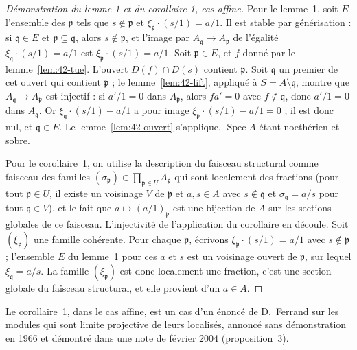 \begin{proof}[Démonstration du lemme 1 et du corollaire 1, cas affine]
Pour le lemme~1, soit $E$ l'ensemble des $\mathfrak p$ tels que $s \notin \mathfrak p$ et $\xi_{\mathfrak p} \cdot (s/1) = a/1$. Il est stable par générisation : si $\mathfrak q \in E$ et $\mathfrak p \subseteq \mathfrak q$, alors $s \notin \mathfrak p$, et l'image par $A_{\mathfrak q} \to A_{\mathfrak p}$ de l'égalité $\xi_{\mathfrak q} \cdot (s/1) = a/1$ est $\xi_{\mathfrak p} \cdot (s/1) = a/1$. Soit $\mathfrak p \in E$, et $f$ donné par le lemme~\ref{lem:42-tue}. L'ouvert $D(f) \cap D(s)$ contient $\mathfrak p$. Soit $\mathfrak q$ un premier de cet ouvert qui contient $\mathfrak p$ ; le lemme~\ref{lem:42-lift}, appliqué à $S = A \setminus \mathfrak q$, montre que $A_{\mathfrak q} \to A_{\mathfrak p}$ est injectif : si $a'/1 = 0$ dans $A_{\mathfrak p}$, alors $fa' = 0$ avec $f \notin \mathfrak q$, donc $a'/1 = 0$ dans $A_{\mathfrak q}$. Or $\xi_{\mathfrak q} \cdot (s/1) - a/1$ a pour image $\xi_{\mathfrak p} \cdot (s/1) - a/1 = 0$ ; il est donc nul, et $\mathfrak q \in E$. Le lemme~\ref{lem:42-ouvert} s'applique, $\operatorname{Spec} A$ étant noethérien et sobre.

Pour le corollaire~1, on utilise la description du faisceau structural comme faisceau des familles $(\sigma_{\mathfrak p}) \in \prod_{\mathfrak p \in U} A_{\mathfrak p}$ qui sont localement des fractions (pour tout $\mathfrak p \in U$, il existe un voisinage $V$ de $\mathfrak p$ et $a, s \in A$ avec $s \notin \mathfrak q$ et $\sigma_{\mathfrak q} = a/s$ pour tout $\mathfrak q \in V$), et le fait que $a \mapsto (a/1)_{\mathfrak p}$ est une bijection de $A$ sur les sections globales de ce faisceau. L'injectivité de l'application du corollaire en découle. Soit $(\xi_{\mathfrak p})$ une famille cohérente. Pour chaque $\mathfrak p$, écrivons $\xi_{\mathfrak p} \cdot (s/1) = a/1$ avec $s \notin \mathfrak p$ ; l'ensemble $E$ du lemme~1 pour ces $a$ et $s$ est un voisinage ouvert de $\mathfrak p$, sur lequel $\xi_{\mathfrak q} = a/s$. La famille $(\xi_{\mathfrak p})$ est donc localement une fraction, c'est une section globale du faisceau structural, et elle provient d'un $a \in A$.
\end{proof}

\begin{remarque}
Le corollaire~1, dans le cas affine, est un cas d'un énoncé de D.~Ferrand sur les modules qui sont limite projective de leurs localisés, annoncé sans démonstration en 1966 \cite{ferrand1966} et démontré dans une note de février 2004 (proposition~3).
\end{remarque}


